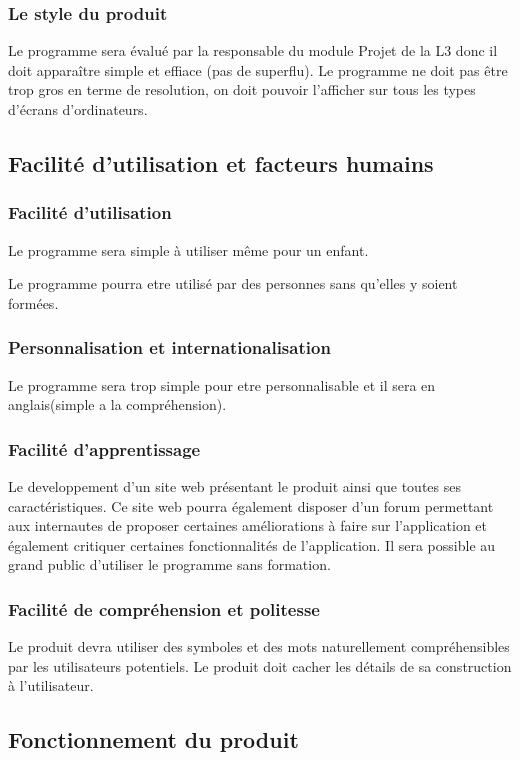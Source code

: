 \documentclass[a4]{article}
\begin{document}
			\subsubsection {Le style du produit}
				Le programme sera évalué par la responsable du module Projet de la L3 donc il doit apparaître simple et effiace (pas de superflu).
				Le programme ne doit pas être trop gros en terme de resolution, on doit pouvoir l'afficher sur 	tous les types d'écrans d'ordinateurs.

		\subsection{Facilité d’utilisation et facteurs humains}
			\subsubsection {Facilité d'utilisation}
				Le programme sera simple à utiliser même pour un enfant.

				Le programme pourra etre utilisé par des personnes sans qu'elles y soient formées.
			\subsubsection {Personnalisation et internationalisation}
				Le programme sera trop simple pour etre personnalisable et il sera en anglais(simple a la compréhension).
			\subsubsection {Facilité d'apprentissage}
				Le developpement d'un site web présentant le produit ainsi que toutes ses caractéristiques. Ce site web pourra également disposer d'un forum permettant aux internautes de proposer certaines	améliorations à faire sur l'application et également critiquer certaines fonctionnalités de l'application.
				Il sera possible au grand public d’utiliser le programme sans formation.
			\subsubsection {Facilité de compréhension et politesse}
				Le produit devra utiliser des symboles et des mots naturellement compréhensibles par les
				utilisateurs potentiels.
				Le produit doit cacher les détails de sa construction à l’utilisateur.

		\subsection{Fonctionnement du produit}
\end{document}
